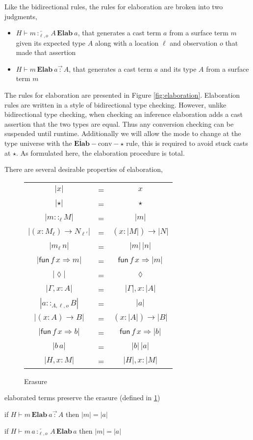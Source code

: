 Like the bidirectional rules, the rules for elaboration are broken
into two judgments, 
\begin{itemize}
\item $H\vdash m\overleftarrow{\,:_{\ell,o}\,}A\,\textbf{Elab}\ a$, that
generates a cast term $a$ from a surface term $m$ given its expected
type $A$ along with a location $\ell$ and observation $o$ that
made that assertion
\item $H\vdash m\,\textbf{Elab}\ a\overrightarrow{\,:\,}A$, that generates
a cast term $a$ and its type $A$ from a surface term $m$
\end{itemize}
The rules for elaboration are presented in Figure \ref{fig:elaboration}.
Elaboration rules are written in a style of bidirectional type checking.
However, unlike bidirectional type checking, when checking an inference
elaboration adds a cast assertion that the two types are equal. Thus
any conversion checking can be suspended until runtime. Additionally
we will allow the mode to change at the type universe with the $\operatorname{\overleftarrow{\textbf{Elab}}-conv-\star}$
rule, this is required to avoid stuck casts at $\star$. As formulated
here, the elaboration procedure is total. 

There are several desirable properties of elaboration, 

\begin{figure}
\begin{tabular}{ccc}
$|x|$ & = & $x$\tabularnewline
$|\star|$ & = & $\star$\tabularnewline
$|m::_{\ell}M|$ & = & $|m|$\tabularnewline
$|\left(x:M_{\ensuremath{\ell}}\right)\rightarrow N_{\ensuremath{\ell'}}|$ & = & $\left(x:|M|\right)\rightarrow|N|$\tabularnewline
$|m_{\ensuremath{\ell}}\,n|$ & = & $|m|\,|n|$\tabularnewline
$|\mathsf{fun}\,f\,x\Rightarrow m|$ & = & $\mathsf{fun}\,f\,x\Rightarrow|m|$\tabularnewline
$|\lozenge|$ & = & $\lozenge$\tabularnewline
$|\Gamma,x:A|$ & = & $|\Gamma|,x:|A|$\tabularnewline
$|a::_{A,\ensuremath{\ell},o}B|$ & = & $|a|$\tabularnewline
$|\left(x:A\right)\rightarrow B|$ & = & $\left(x:|A|\right)\rightarrow|B|$\tabularnewline
$|\mathsf{fun}\,f\,x\Rightarrow b|$ & = & $\mathsf{fun}\,f\,x\Rightarrow|b|$\tabularnewline
$|b\,a|$ & = & $|b|\,|a|$\tabularnewline
$|H,x:M|$ & = & $|H|,x:|M|$\tabularnewline
\end{tabular}\caption{Erasure}
\label{fig:erasure}
\end{figure}

\begin{thm}
elaborated terms preserve the erasure (defined in \ref{fig:erasure})

if $H\vdash m\,\textbf{Elab}\ a\overrightarrow{\,:\,}A$ then $|m|=|a|$ 

if $H\vdash m\,a\overleftarrow{\,:_{\ensuremath{\ell},o}\,}A\,\textbf{Elab}\,a$
then $|m|=|a|$ 
\end{thm}

